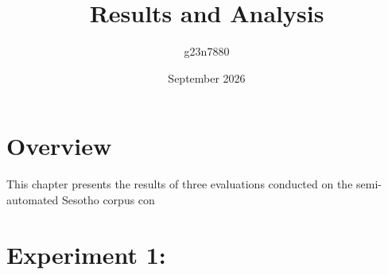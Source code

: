 \documentclass{article}
\title{Results and Analysis}
\author{g23n7880 }
\date{September 2026}
\begin{document}
\maketitle
\section{Overview}

This chapter presents the results of three evaluations conducted on the semi-automated Sesotho corpus con
\section{Experiment 1: }
\end{document}
